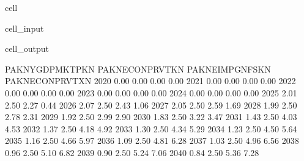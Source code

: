\documentclass[letterpaper,10pt,english]{jupyterBook}
\begin{document}
\begin{sphinxuseclass}{cell}\begin{sphinxVerbatimInput}

\begin{sphinxuseclass}{cell_input}
\begin{sphinxVerbatim}[commandchars=\\\{\}]
   
  
     
        \PYG{p}{[}\PYG{p}{]}
\end{sphinxVerbatim}

\end{sphinxuseclass}\end{sphinxVerbatimInput}
\begin{sphinxVerbatimOutput}

\begin{sphinxuseclass}{cell_output}
\begin{sphinxVerbatim}[commandchars=\\\{\}]
      PAKNYGDPMKTPKN  PAKNECONPRVTKN  PAKNEIMPGNFSKN  PAKNECONPRVTXN
2020            0.00            0.00            0.00            0.00
2021            0.00            0.00            0.00            0.00
2022            0.00            0.00            0.00            0.00
2023            0.00            0.00            0.00            0.00
2024            0.00            0.00            0.00            0.00
2025            2.01            2.50            2.27            0.44
2026            2.07            2.50            2.43            1.06
2027            2.05            2.50            2.59            1.69
2028            1.99            2.50            2.78            2.31
2029            1.92            2.50            2.99            2.90
2030            1.83            2.50            3.22            3.47
2031            1.43            2.50            4.03            4.53
2032            1.37            2.50            4.18            4.92
2033            1.30            2.50            4.34            5.29
2034            1.23            2.50            4.50            5.64
2035            1.16            2.50            4.66            5.97
2036            1.09            2.50            4.81            6.28
2037            1.03            2.50            4.96            6.56
2038            0.96            2.50            5.10            6.82
2039            0.90            2.50            5.24            7.06
2040            0.84            2.50            5.36            7.28
\end{sphinxVerbatim}


\end{sphinxuseclass}
\end{sphinxVerbatimOutput}
\end{sphinxuseclass}
\end{document}
